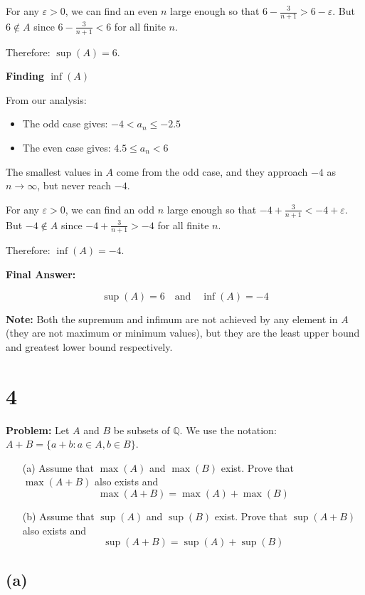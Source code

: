 \documentclass[12pt,a4paper]{article}
\theoremstyle{definition}
\theoremstyle{remark}
\begin{document}
For any $\varepsilon > 0$, we can find an even $n$ large enough so that $6 - \frac{3}{n+1} > 6 - \varepsilon$.
But $6 \notin A$ since $6 - \frac{3}{n+1} < 6$ for all finite $n$.

Therefore: $\sup(A) = 6$.

\textbf{Finding $\inf(A)$}

From our analysis:
\begin{itemize}
\item The odd case gives: $-4 < a_n \leq -2.5$
\item The even case gives: $4.5 \leq a_n < 6$
\end{itemize}

The smallest values in $A$ come from the odd case, and they approach $-4$ as $n \to \infty$, but never reach $-4$.

For any $\varepsilon > 0$, we can find an odd $n$ large enough so that $-4 + \frac{3}{n+1} < -4 + \varepsilon$.
But $-4 \notin A$ since $-4 + \frac{3}{n+1} > -4$ for all finite $n$.

Therefore: $\inf(A) = -4$.

\textbf{Final Answer:}

$$\sup(A) = 6 \quad \text{and} \quad \inf(A) = -4$$

\textbf{Note:} Both the supremum and infimum are not achieved by any element in $A$ (they are not maximum or minimum values), but they are the least upper bound and greatest lower bound respectively.

\section*{4}

\textbf{Problem:} Let $A$ and $B$ be subsets of $\mathbb{Q}$. We use the notation: $A + B = \{a + b : a \in A, b \in B\}$.

\begin{enumerate}
\item[(a)] Assume that $\max(A)$ and $\max(B)$ exist. Prove that $\max(A + B)$ also exists and
$$\max(A + B) = \max(A) + \max(B)$$
\item[(b)] Assume that $\sup(A)$ and $\sup(B)$ exist. Prove that $\sup(A + B)$ also exists and
$$\sup(A + B) = \sup(A) + \sup(B)$$
\end{enumerate}

\subsection*{(a)}
\end{document}
